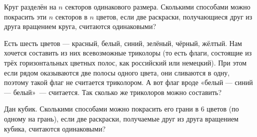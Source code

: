 ﻿
\begin{enumerate}
\itA Круг разделён на $n$ секторов одинакового размера. Сколькими способами можно покрасить эти $n$ секторов в $n$ цветов, если две раскраски, получающиеся друг из друга вращением круга, считаются одинаковыми?

\itB Есть шесть цветов — красный, белый, синий, зелёный, чёрный, жёлтый. Нам хочется составить из них всевозможные триколоры (то есть флаги, состоящие из трёх горизонтальных цветных полос, как российский или немецкий). При этом если рядом оказываются две полосы одного цвета, они сливаются в одну, поэтому такой флаг не считается триколором. А вот флаг вроде «белый — синий — белый»~— считается. Так сколько же триколоров можно составить?

\itC Дан кубик. Сколькими способами можно покрасить его грани в 6 цветов (по одному на грань), если две раскраски, получаемые друг из друга вращением кубика, считаются одинаковыми?
\end{enumerate}